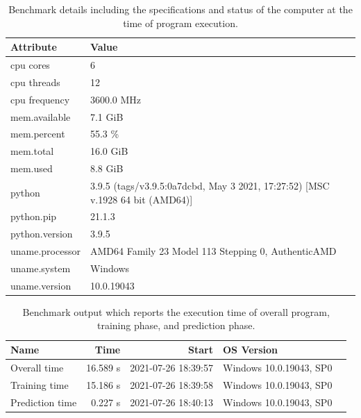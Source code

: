\begin{table}[htb]
  
  \caption{Benchmark details including the specifications and status
    of the computer at the time of program execution.}
  
\label{tab:resource}
\begin{tabular}{p{2cm}p{5cm}}
Attribute        & Value  \\
\hline
 cpu cores        & 6    \\
 cpu threads      & 12    \\
 cpu frequency    & 3600.0 MHz      \\
 mem.available    & 7.1 GiB \\
 mem.percent      & 55.3 \%  \\
 mem.total        & 16.0 GiB \\
 mem.used         & 8.8 GiB  \\
 python           & 3.9.5 (tags/v3.9.5:0a7dcbd, May  3 2021, 17:27:52) [MSC v.1928 64 bit (AMD64)]  \\
 python.pip       & 21.1.3   \\
 python.version   & 3.9.5 \\
 uname.processor  & AMD64 Family 23 Model 113 Stepping 0, AuthenticAMD   \\
 uname.system     & Windows \\
 uname.version    & 10.0.19043 \\
 \hline
 \end{tabular}
 \end{table}


\begin{table}[htb]
  
  \caption{Benchmark output which reports the execution time of
    overall program, training phase, and prediction phase.}
  
\label{tab:second}
\begin{tabular}{lrrll}
Name            &   Time   & Start               & OS Version \\
\hline
 Overall time    & 16.589 s & 2021-07-26 18:39:57 & Windows  10.0.19043, SP0 \\
Training time   & 15.186 s & 2021-07-26 18:39:58 & Windows 10.0.19043, SP0 \\
 Prediction time &  0.227 s & 2021-07-26 18:40:13 & Windows 10.0.19043, SP0 \\
 \hline
 \end{tabular}
 \end{table}
 
